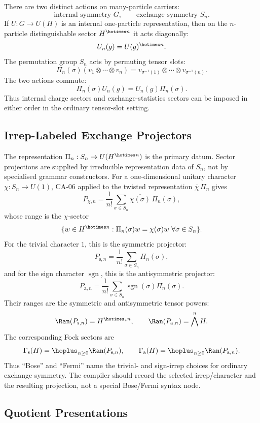 There are two distinct actions on many-particle carriers:
\[
  \text{internal symmetry }G,\qquad
  \text{exchange symmetry }S_n.
\]
If \(U:G\to U(H)\) is an internal one-particle representation, then on the
\(n\)-particle distinguishable sector \(H^{\hotimes n}\) it acts diagonally:
\[
  U_n(g)=U(g)^{\hotimes n}.
\]
The permutation group \(S_n\) acts by permuting tensor slots:
\[
  \Pi_n(\sigma)(v_1\otimes\cdots\otimes v_n)
  =
  v_{\sigma^{-1}(1)}\otimes\cdots\otimes v_{\sigma^{-1}(n)}.
\]
The two actions commute:
\[
  \Pi_n(\sigma)U_n(g)=U_n(g)\Pi_n(\sigma).
\]
Thus internal charge sectors and exchange-statistics sectors can be imposed in
either order in the ordinary tensor-slot setting.

\subsection{Irrep-Labeled Exchange Projectors}

The representation \(\Pi_n:S_n\to U(H^{\hotimes n})\) is the primary datum.
Sector projections are supplied by irreducible representation data of \(S_n\),
not by specialised grammar constructors.  For a one-dimensional unitary
character \(\chi:S_n\to U(1)\), CA-06 applied to the twisted representation
\(\overline{\chi}\,\Pi_n\) gives
\[
  P_{\chi,n}
  =
  \frac1{n!}\sum_{\sigma\in S_n}\overline{\chi(\sigma)}\,\Pi_n(\sigma),
\]
whose range is the \(\chi\)-sector
\[
  \{w\in H^{\hotimes n}:\Pi_n(\sigma)w=\chi(\sigma)w\ \forall\sigma\in S_n\}.
\]
For the trivial character \(1\), this is the symmetric projector:
\[
  P_{\mathrm s,n}
  =
  \frac1{n!}\sum_{\sigma\in S_n}\Pi_n(\sigma),
\]
and for the sign character \(\operatorname{sgn}\), this is the antisymmetric
projector:
\[
  P_{\mathrm a,n}
  =
  \frac1{n!}\sum_{\sigma\in S_n}\operatorname{sgn}(\sigma)\Pi_n(\sigma).
\]
Their ranges are the symmetric and antisymmetric tensor powers:
\[
  \Ran(P_{\mathrm s,n})=H^{\hotimes_s n},\qquad
  \Ran(P_{\mathrm a,n})=\bigwedge^n H.
\]
The corresponding Fock sectors are
\[
  \Gamma_{\mathrm s}(H)=\hoplus_{n\ge0}\Ran(P_{\mathrm s,n}),\qquad
  \Gamma_{\mathrm a}(H)=\hoplus_{n\ge0}\Ran(P_{\mathrm a,n}).
\]
Thus ``Bose'' and ``Fermi'' name the trivial- and sign-irrep choices for ordinary
exchange symmetry.  The compiler should record the selected irrep/character and
the resulting projection, not a special Bose/Fermi syntax node.

\subsection{Quotient Presentations}


